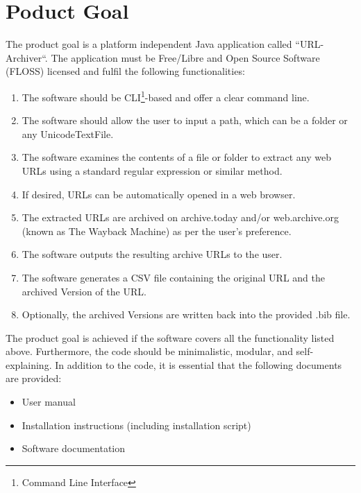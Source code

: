 \section{Poduct Goal}
The product goal  is a platform independent Java application called ``\gls{URL}-Archiver``.
The application must be Free/Libre and Open Source Software (\gls{FLOSS}) licensed and fulfil the following functionalities:
\begin{enumerate}
    \item The software should be \gls{CLI}\footnote{Command Line Interface}-based and offer a clear command line.
    \item The software should allow the user to input a path, which can be a folder or any \gls{UnicodeTextFile}.
    \item The software examines the contents of a file or folder to extract any web URLs using a standard regular expression or similar method.
    \item If desired, URLs can be automatically opened in a web browser.
    \item The extracted URLs are archived on archive.today and/or web.archive.org (known as The Wayback Machine) as per the user's preference.
    \item The software outputs the resulting archive URLs to the user.
    \item The software generates a CSV file containing the original URL and the archived Version of the URL.
    \item Optionally, the archived Versions are written back into the provided .bib file.
\end{enumerate}
The product goal is achieved if the software covers all the functionality listed above.
Furthermore, the code should be minimalistic, modular, and self-explaining.
In addition to the code, it is essential that the following documents are provided:
\begin{itemize}
    \item User manual
    \item Installation instructions (including installation script)
    \item Software documentation
\end{itemize}

